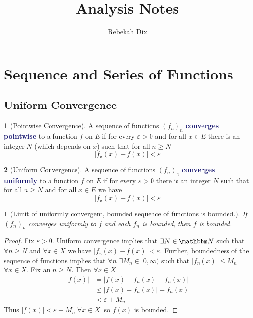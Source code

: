 \documentclass[12pt]{article}
\title{Analysis Notes}
\author{Rebekah Dix}
\numberwithin{equation}{section}
\newcommand{\navy}[1]{\textcolor{MidnightBlue}{\bf #1}}
\theoremstyle{plain}
\newtheorem{theorem}{\color{ForestGreen}{\textbf{Theorem}}}[section]
\theoremstyle{definition}
\newtheorem{definition}{\color{MidnightBlue}{\textbf{Definition}}}[section]
\newcommand{\1}{\mathbbm 1}
\newcommand{\e}{\varepsilon}
\newcommand{\NN}{\mathbbm N}
\begin{document}
\maketitle
\tableofcontents
\newpage 

\section{Sequence and Series of Functions}

\subsection{Uniform Convergence}

\begin{definition}[Pointwise Convergence]
	A sequence of functions $(f_n)_n$ \navy{converges pointwise} to a function $f$ on $E$ if for every $\e > 0$ and for all $x \in E$ there is an integer $N$ (which depends on $x$) such that for all $n \geq N$
	\begin{equation*}
		|f_n(x) - f(x)| < \e
	\end{equation*}
\end{definition}

\begin{definition}[Uniform Convergence]
	A sequence of functions $(f_n)_n$ \navy{converges uniformly} to a function $f$ on $E$ if for every $\e > 0$ there is an integer $N$ such that for all $n \geq N$ and for all $x \in E$ we have
	\begin{equation*}
		|f_n(x) - f(x)| < \e
	\end{equation*}
\end{definition}

\begin{theorem}[Limit of uniformly convergent, bounded sequence of functions is bounded.]
	If $(f_n)_n$ converges uniformly to $f$ and each $f_n$ is bounded, then $f$ is bounded. 
\end{theorem}
\begin{proof}
	Fix $\e > 0$. Uniform convergence implies that $\exists N \in \NN$ such that $\forall n \geq N$ and $\forall x \in X$ we have $|f_n(x) - f(x)| < \e$. Further, boundedness of the sequence of functions implies that $\forall n$ $\exists M_n \in [0,\infty)$ such that $|f_n(x)| \leq M_n$ $\forall x \in X$. Fix an $n \geq N$. Then $\forall x \in X$
	\begin{align*}
		|f(x)| &= |f(x) - f_n(x) + f_n(x)| \\
		&\leq |f(x) - f_n(x)| + f_n(x) \tag{trianlge inequality} \\
		& < \e + M_n \tag{uniform convergence and boundedness}
	\end{align*}
	Thus $|f(x)| < \e + M_n$ $\forall x \in X$, so $f(x)$ is bounded.
\end{proof}
\end{document}
